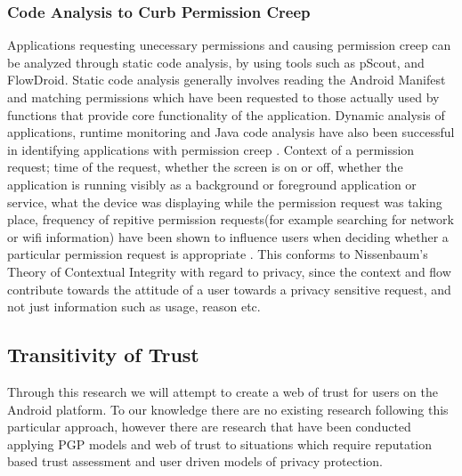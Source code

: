 \subsubsection{Code Analysis to Curb Permission Creep}
Applications requesting unecessary permissions and causing permission creep can be analyzed through static code analysis, by using tools such as pScout\cite{au2012pscout}, and FlowDroid\cite{arzt2014flowdroid}. Static code analysis generally involves reading the Android Manifest and matching permissions which have been requested to those actually used by functions that provide core functionality of the application. Dynamic analysis of applications, runtime monitoring and Java code analysis have also been successful in identifying applications with permission creep \cite{spreitzenbarth2013mobile}. Context of a permission request; time of the request, whether the screen is on or off, whether the application is running visibly as a background or foreground application or service, what the device was displaying while the permission request was taking place, frequency of repitive permission requests(for example searching for network or wifi information) have been shown to influence users when deciding whether a particular permission request is appropriate \cite{wijesekera2015android}. This conforms to Nissenbaum's Theory of Contextual Integrity\cite{nissenbaum2004privacy} with regard to privacy, since the context and flow contribute towards the attitude of a user towards a privacy sensitive request, and not just information such as usage, reason etc.

\subsection{Transitivity of Trust}
Through this research we will attempt to create a web of trust for users on the Android platform. To our knowledge there are no existing research following this particular approach, however there are research that have been conducted applying PGP models and web of trust to situations which require reputation based trust assessment and user driven models of privacy protection. 

